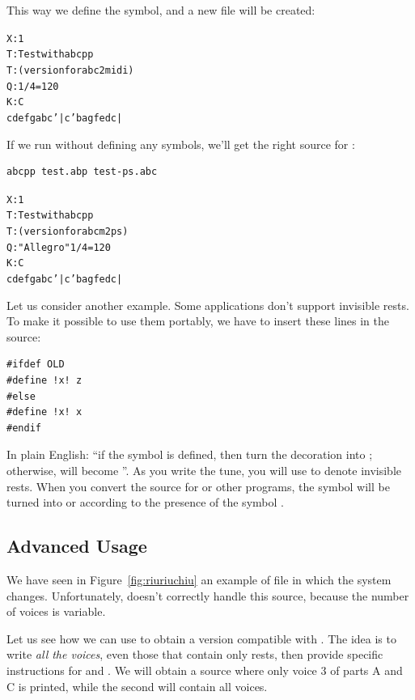 \documentclass[a4paper,fullpage,12pt]{book}
\begin{document}
This way we define the  symbol, and a new \ABC{} file
will be created:

\begin{alltt}
X: 1
T: Test with abcpp
T: (version for abc2midi)
Q: 1/4 = 120
K: C
cdef gabc'|c'bag fedc|
\end{alltt}

If we run \abcpp{} without defining any symbols, we'll get the right
source for \abcm:

\begin{verbatim}
abcpp test.abp test-ps.abc
\end{verbatim}

\begin{alltt}
X: 1
T: Test with abcpp
T: (version for abcm2ps)
Q: "Allegro" 1/4 = 120
K: C
cdef gabc'|c'bag fedc|
\end{alltt}

Let us consider another example. Some \ABC{} applications don't
support invisible rests. To make it possible to use them portably, we
have to insert these lines in the source:

\begin{verbatim}
#ifdef OLD
#define !x! z
#else
#define !x! x
#endif
\end{verbatim}

In plain English: ``if the  symbol is defined, then turn the
 decoration into ; otherwise,  will become
''. As you write the tune, you will use  to denote
invisible rests. When you convert the source for \abcm{} or other
programs, the  symbol will be turned into  or 
according to the presence of the symbol .


\subsection{Advanced Usage}


We have seen in Figure~\ref{fig:riuriuchiu} an example of \ABC{} file
in which the system changes. Unfortunately, \abcmid{} doesn't
correctly handle this source, because the number of voices is
variable.

Let us see how we can use \abcpp{} to obtain a version compatible with
\abcmid. The idea is to write \emph{all the voices}, even those that
contain only rests, then provide specific instructions for \abcm{} and
\abcmid. We will obtain a source where only voice 3 of parts A and C
is printed, while the second will contain all voices.
\end{document}
